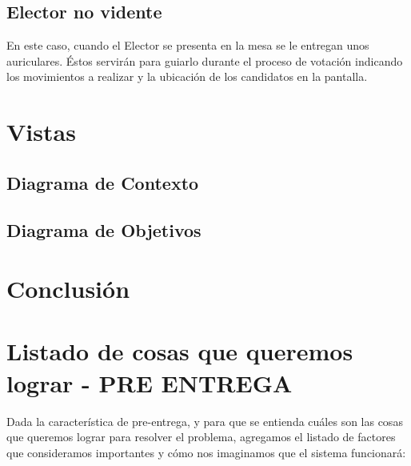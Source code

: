 \documentclass[spanish, 10pt,a4paper]{article}
\numberwithin{equation}{section} %
\begin{document}
\subsection{Elector no vidente}

	En este caso, cuando el Elector se presenta en la mesa se le entregan unos auriculares. Éstos servirán para guiarlo durante el proceso de votación indicando los movimientos a realizar y la ubicación de los candidatos en la pantalla.

\newpage
\section{Vistas}
\subsection{Diagrama de Contexto}


\subsection{Diagrama de Objetivos}

\newpage
\section{Conclusión}
	\newpage

\newpage
\section{Listado de cosas que queremos lograr - PRE ENTREGA}

Dada la característica de pre-entrega, y para que se entienda cuáles son las cosas que queremos lograr para resolver el problema, agregamos el listado de factores que consideramos importantes y cómo nos imaginamos que el sistema funcionará: 
\end{document}
